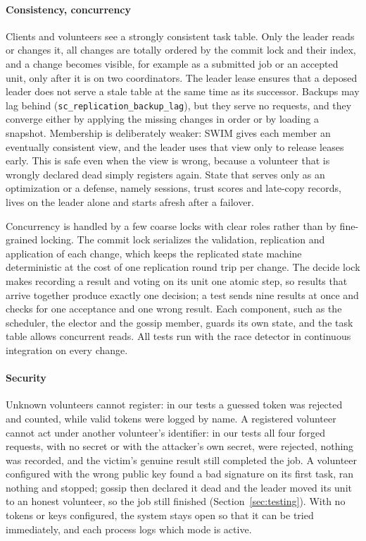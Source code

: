 \paragraph{Consistency, concurrency} Clients and volunteers see a strongly consistent task table. Only the leader reads or changes it, all changes are totally ordered by the commit lock and their index, and a change becomes visible, for example as a submitted job or an accepted unit, only after it is on two coordinators. The leader lease ensures that a deposed leader does not serve a stale table at the same time as its successor. Backups may lag behind (\texttt{sc\_replication\_backup\_lag}), but they serve no requests, and they converge either by applying the missing changes in order or by loading a snapshot. Membership is deliberately weaker: SWIM gives each member an eventually consistent view, and the leader uses that view only to release leases early. This is safe even when the view is wrong, because a volunteer that is wrongly declared dead simply registers again. State that serves only as an optimization or a defense, namely sessions, trust scores and late-copy records, lives on the leader alone and starts afresh after a failover.

Concurrency is handled by a few coarse locks with clear roles rather than by fine-grained locking. The commit lock serializes the validation, replication and application of each change, which keeps the replicated state machine deterministic at the cost of one replication round trip per change. The decide lock makes recording a result and voting on its unit one atomic step, so results that arrive together produce exactly one decision; a test sends nine results at once and checks for one acceptance and one wrong result. Each component, such as the scheduler, the elector and the gossip member, guards its own state, and the task table allows concurrent reads. All tests run with the race detector in continuous integration on every change.

\paragraph{Security}
Unknown volunteers cannot register: in our tests a guessed token was rejected and counted, while valid tokens were logged by name. A registered volunteer cannot act under another volunteer's identifier: in our tests all four forged requests, with no secret or with the attacker's own secret, were rejected, nothing was recorded, and the victim's genuine result still completed the job. A volunteer configured with the wrong public key found a bad signature on its first task, ran nothing and stopped; gossip then declared it dead and the leader moved its unit to an honest volunteer, so the job still finished (Section~\ref{sec:testing}). With no tokens or keys configured, the system stays open so that it can be tried immediately, and each process logs which mode is active.
